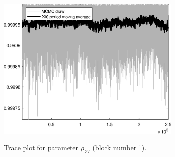 \begin{figure}[H]
\centering
  \includegraphics[width=0.8\textwidth]{BRS_growth_ext_util/graphs/TracePlot_rho_ZI_blck_1}\\
    \caption{Trace plot for parameter ${\rho_{ZI}}$ (block number 1).}
\end{figure}
